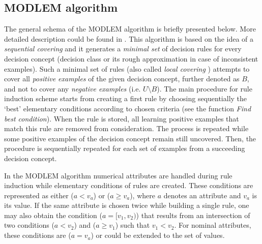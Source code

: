 \documentclass{llncs}
\begin{document}
\subsection{MODLEM algorithm}

The general schema of the MODLEM algorithm is briefly presented below. More
detailed description could be found in \cite{GrzymStef,modlem,habcia}. This
algorithm is based on the idea of a \emph{sequential covering} and it
generates a {\em minimal set} of decision rules for every decision concept
(decision class or its rough approximation in case of inconsistent
examples). Such a minimal set of rules (also called {\em local covering}
\cite{lers}) attempts to cover all \emph{positive examples} of the given
decision concept, further denoted as $B$,   and not to cover any
\emph{negative examples} (i.e. $U \setminus B$). The main procedure for rule
induction scheme starts from creating a first rule by choosing sequentially
the `best' elementary conditions according to chosen criteria (see the
function {\em Find best condition}). When the rule is stored, all learning
positive examples that match this rule are removed from consideration. The
process is repeated while some positive examples of the decision concept
remain still uncovered. Then, the procedure is sequentially repeated for
each set of examples from a succeeding decision concept.

In the MODLEM algorithm numerical attributes are handled during rule
induction while elementary conditions of rules are created. These conditions
are represented as either ($a < v_a$) or ($a \geq v_a$), where $a$ denotes
an attribute and $v_a$ is its value. If the same attribute is chosen twice
while building a single rule, one may also obtain the condition ($a = [v_1,
v_2)$) that results from an intersection of two conditions ($a < v_2$) and
($a \geq v_1$) such that $v_1 < v_2$. For nominal attributes, these
conditions are ($a = v_a$) or could be extended to the set of values.

\newenvironment{algo}{\newcommand{\B}{{\bf begin}}
\newcommand{\DO}{{\bf do}~} \newcommand{\E}{{\bf end}}
\newcommand{\FOR}{{\bf for}~} \newcommand{\IF}{{\bf if}~}
\newcommand{\THEN}{{\bf then}~}
\newcommand{\ELSE}{{\bf else}~}
\newcommand{\WHILE}{{\bf while}~}
\small
\begin{tabbing}
99999\= 999\= 999\= 999\= 999\= 999\= \+ \+ \kill}{\end{tabbing}
\normalsize}
\end{document}
